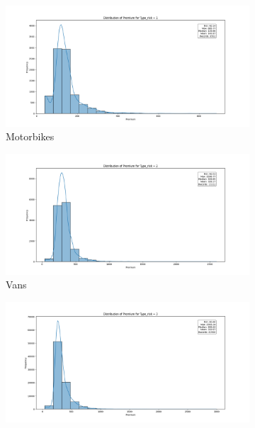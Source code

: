 \documentclass{llncs}
\begin{document}
\begin{figure}
    \centering
     \begin{subfigure}{0.45\linewidth}
      \includegraphics[width=\linewidth]{images/premium_risk1.png}
      \caption{Motorbikes}
      \label{fig:subfig1}
     \end{subfigure}
     \begin{subfigure}{0.45\linewidth}
      \includegraphics[width=\linewidth]{images/premium_risk2.png}
      \caption{Vans}
      \label{fig:subfig2}
      \end{subfigure}
  \vfill
       \begin{subfigure}{0.45\linewidth}
       \includegraphics[width=\linewidth]{images/premium_risk3.png}

\end{subfigure}
\end{figure}
\end{document}
